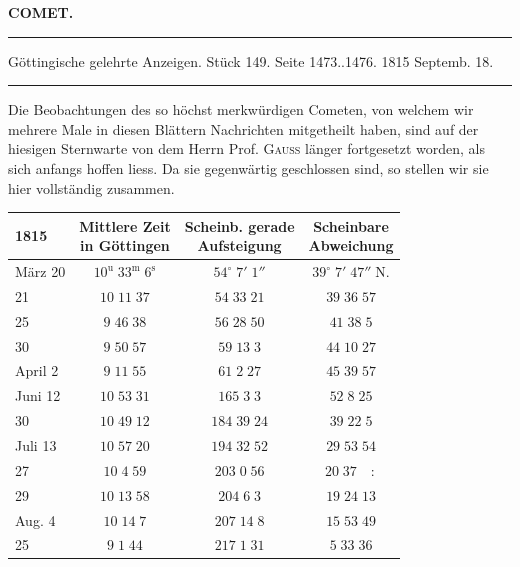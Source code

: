 \clearpage{}\hypertarget{native-394-lower}{}\label{native-394-lower}
\begin{center}\textbf{COMET.}\par\vspace{4pt}\hrule\vspace{4pt}\fontsize{10}{12}\selectfont Göttingische gelehrte Anzeigen. Stück 149. Seite 1473..1476. 1815 Septemb. 18.\par\vspace{4pt}\hrule\vspace{4pt}\end{center}

\par\indent Die Beobachtungen des so höchst merkwürdigen Cometen, von welchem wir mehrere Male in
diesen Blättern Nachrichten mitgetheilt haben, sind auf der hiesigen Sternwarte von dem Herrn Prof.
\textsc{Gauss} länger fortgesetzt worden, als sich anfangs hoffen liess. Da sie gegenwärtig geschlossen sind, so
stellen wir sie hier vollständig zusammen.

\begin{center}\fontsize{10}{12}\selectfont\setlength{\tabcolsep}{5pt}\renewcommand{\arraystretch}{1.15}\begin{tabular}{l|c|c|c}
1815 & \shortstack{Mittlere Zeit\\in Göttingen} & \shortstack{Scheinb. gerade\\Aufsteigung} & \shortstack{Scheinbare\\Abweichung}\\\hline
März 20 & $10^{\mathrm u}\;33^{\mathrm m}\;6^{\mathrm s}$ & $54^\circ\;7'\;1''$ & $39^\circ\;7'\;47''\;\mathrm{N.}$\\
21 & $10\;11\;37$ & $54\;33\;21$ & $39\;36\;57$\\
25 & $9\;46\;38$ & $56\;28\;50$ & $41\;38\;5$\\
30 & $9\;50\;57$ & $59\;13\;3$ & $44\;10\;27$\\
April 2 & $9\;11\;55$ & $61\;2\;27$ & $45\;39\;57$\\
Juni 12 & $10\;53\;31$ & $165\;3\;3$ & $52\;8\;25$\\
30 & $10\;49\;12$ & $184\;39\;24$ & $39\;22\;5$\\
Juli 13 & $10\;57\;20$ & $194\;32\;52$ & $29\;53\;54$\\
27 & $10\;4\;59$ & $203\;0\;56$ & $20\;37\quad:$\\
29 & $10\;13\;58$ & $204\;6\;3$ & $19\;24\;13$\\
Aug. 4 & $10\;14\;7$ & $207\;14\;8$ & $15\;53\;49$\\
25 & $9\;1\;44$ & $217\;1\;31$ & $5\;33\;36$\\
\end{tabular}\end{center}

